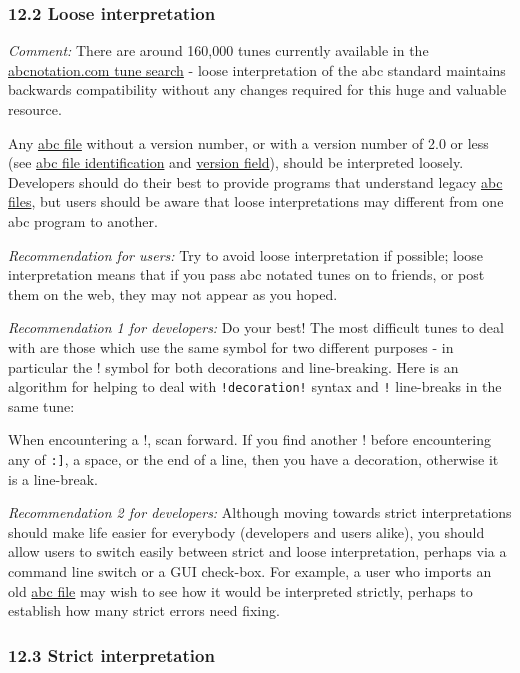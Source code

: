 \documentclass[oneside]{book}
\begin{document}
\hypertarget{loose_interpretation}{\subsubsection{12.2 Loose
interpretation}\label{loose_interpretation}}

\emph{Comment:} There are around 160,000 tunes currently available in
the \href{http://abcnotation.com/search}{abcnotation.com tune search} -
loose interpretation of the abc standard maintains backwards
compatibility without any changes required for this huge and valuable
resource.

Any \protect\hyperlink{abc_file_definition}{abc file} without a version
number, or with a version number of 2.0 or less (see
\protect\hyperlink{abc_file_identification}{abc file identification} and
\protect\hyperlink{version_field}{version field}), should be interpreted
loosely. Developers should do their best to provide programs that
understand legacy \protect\hyperlink{abc_file_definition}{abc files},
but users should be aware that loose interpretations may different from
one abc program to another.

\emph{Recommendation for users:} Try to avoid loose interpretation if
possible; loose interpretation means that if you pass abc notated tunes
on to friends, or post them on the web, they may not appear as you
hoped.

\emph{Recommendation 1 for developers:} Do your best! The most difficult
tunes to deal with are those which use the same symbol for two different
purposes - in particular the ! symbol for both decorations and
line-breaking. Here is an algorithm for helping to deal with
\texttt{!decoration!} syntax and \texttt{!} line-breaks in the same
tune:

When encountering a !, scan forward. If you find another ! before
encountering any of \texttt{\textbar{}{[}:{]}}, a space, or the end of a
line, then you have a decoration, otherwise it is a line-break.

\emph{Recommendation 2 for developers:} Although moving towards strict
interpretations should make life easier for everybody (developers and
users alike), you should allow users to switch easily between strict and
loose interpretation, perhaps via a command line switch or a GUI
check-box. For example, a user who imports an old
\protect\hyperlink{abc_file_definition}{abc file} may wish to see how it
would be interpreted strictly, perhaps to establish how many strict
errors need fixing.

\hypertarget{strict_interpretation}{\subsubsection{12.3 Strict
interpretation}\label{strict_interpretation}}
\end{document}

